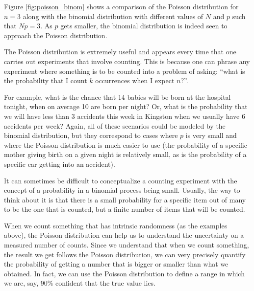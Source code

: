 
Figure \ref{fig:poisson_binom} shows a comparison of the Poisson distribution for $n=3$ along with the binomial distribution with different values of $N$ and $p$ such that $Np=3$. As $p$ gets smaller, the binomial distribution is indeed seen to approach the Poisson distribution.


The Poisson distribution is extremely useful and appears every time that one carries out experiments that involve counting. This is because one can phrase any experiment where something is to be counted into a problem of asking: ``what is the probability that I count $k$ occurrences when I expect $n$?''.

For example, what is the chance that 14 babies will be born at the hospital tonight, when on average 10 are born per night? Or, what is the probability that we will have less than 3 accidents this week in Kingston when we usually have 6 accidents per week? Again, all of these scenarios could be modeled by the binomial distribution, but they correspond to cases where $p$ is very small and where the Poisson distribution is much easier to use (the probability of a specific mother giving birth on a given night is relatively small, as is the probability of a specific car getting into an accident).

It can sometimes be difficult to conceptualize a counting experiment with the concept of a probability in a binomial process being small. Usually, the way to think about it is that there is a small probability for a specific item out of many to be the one that is counted, but a finite number of items that will be counted. 

When we count something that has intrinsic randomness (as the examples above), the Poisson distribution can help us to understand the uncertainty on a measured number of counts. Since we understand that when we count something, the result we get follows the Poisson distribution, we can very precisely quantify the probability of getting a number that is bigger or smaller than what we obtained. In fact, we can use the Poisson distribution to define a range in which we are, say, 90\% confident that the true value lies.

